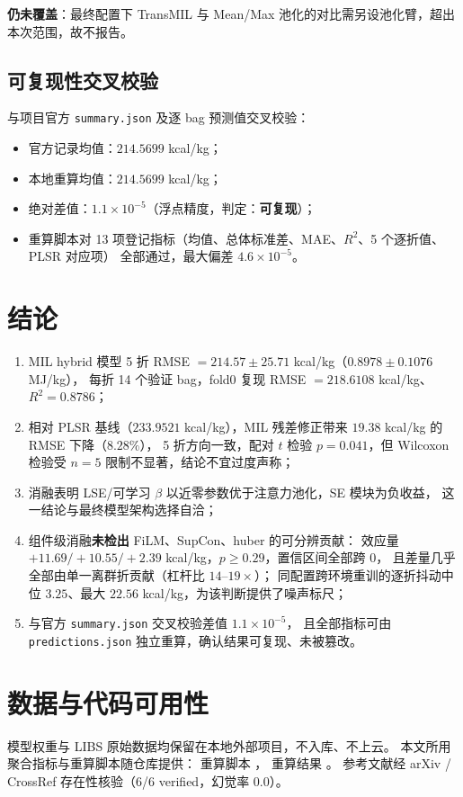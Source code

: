 \documentclass[11pt,a4paper,UTF8]{ctexart}
\begin{document}
\textbf{仍未覆盖}：最终配置下 TransMIL 与 Mean/Max 池化的对比需另设池化臂，超出本次范围，故不报告。

\subsection{可复现性交叉校验}
与项目官方 \texttt{summary.json} 及逐 bag 预测值交叉校验：
\begin{itemize}
\item 官方记录均值：$214.5699$ kcal/kg；
\item 本地重算均值：$214.5699$ kcal/kg；
\item 绝对差值：$1.1 \times 10^{-5}$（浮点精度，判定：\textbf{可复现}）；
\item 重算脚本对 13 项登记指标（均值、总体标准差、MAE、$R^2$、5 个逐折值、PLSR 对应项）
  全部通过，最大偏差 $4.6\times10^{-5}$。
\end{itemize}

\section{结论}
\begin{enumerate}
\item MIL hybrid 模型 5 折 RMSE $= 214.57 \pm 25.71$ kcal/kg（$0.8978 \pm 0.1076$ MJ/kg），
  每折 14 个验证 bag，fold0 复现 RMSE $= 218.6108$ kcal/kg、$R^2 = 0.8786$；
\item 相对 PLSR 基线（$233.9521$ kcal/kg），MIL 残差修正带来 $19.38$ kcal/kg 的 RMSE 下降（$8.28\%$），
  5 折方向一致，配对 $t$ 检验 $p=0.041$，但 Wilcoxon 检验受 $n=5$ 限制不显著，结论不宜过度声称；
\item 消融表明 LSE/可学习 $\beta$ 以近零参数优于注意力池化，SE 模块为负收益，
  这一结论与最终模型架构选择自洽；
\item 组件级消融\textbf{未检出} FiLM、SupCon、huber 的可分辨贡献：
  效应量 $+11.69/+10.55/+2.39$ kcal/kg，$p\geq 0.29$，置信区间全部跨 $0$，
  且差量几乎全部由单一离群折贡献（杠杆比 $14$--$19\times$）；
  同配置跨环境重训的逐折抖动中位 $3.25$、最大 $22.56$ kcal/kg，为该判断提供了噪声标尺；
\item 与官方 \texttt{summary.json} 交叉校验差值 $1.1\times10^{-5}$，
  且全部指标可由 \texttt{predictions.json} 独立重算，确认结果可复现、未被篡改。
\end{enumerate}

\section*{数据与代码可用性}
模型权重与 LIBS 原始数据均保留在本地外部项目，不入库、不上云。
本文所用聚合指标与重算脚本随仓库提供：
重算脚本 ，
重算结果 。
参考文献经 arXiv / CrossRef 存在性核验（6/6 verified，幻觉率 $0.0$）。
\end{document}
